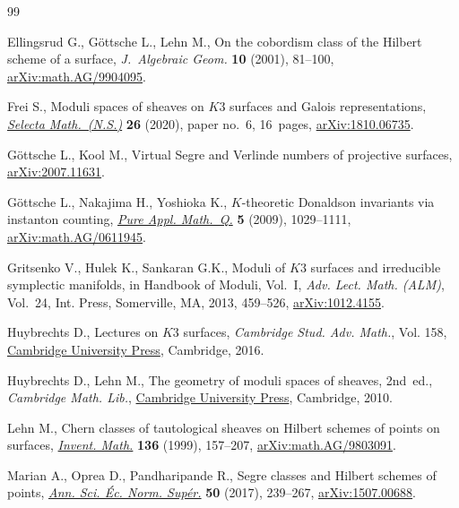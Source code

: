 \documentclass[pdftex]{sigma}
\numberwithin{equation}{section}
\newcommand{\1}{\mathsf{1}}
\begin{document}
%
%

\begin{thebibliography}{99}
\footnotesize\itemsep=0pt

Ellingsrud G., G\"ottsche L., Lehn M., On the cobordism class of the {H}ilbert
  scheme of a surface, \textit{J.~Algebraic Geom.} \textbf{10} (2001), 81--100,
  \href{https://arxiv.org/abs/math.AG/9904095}{arXiv:math.AG/9904095}.

Frei S., Moduli spaces of sheaves on {$K3$} surfaces and {G}alois
  representations, \href{https://doi.org/10.1007/s00029-019-0530-7}{\textit{Selecta Math.~(N.S.)}} \textbf{26} (2020), paper no.~6, 16~pages, \href{https://arxiv.org/abs/1810.06735}{arXiv:1810.06735}.

G\"ottsche L., Kool M., Virtual Segre and Verlinde numbers of projective
  surfaces, \href{https://arxiv.org/abs/2007.11631}{arXiv:2007.11631}.

G\"ottsche L., Nakajima H., Yoshioka K., {$K$}-theoretic {D}onaldson invariants
  via instanton counting, \href{https://doi.org/10.4310/PAMQ.2009.v5.n3.a5}{\textit{Pure Appl. Math.~Q.}} \textbf{5} (2009),
  1029--1111, \href{https://arxiv.org/abs/math.AG/0611945}{arXiv:math.AG/0611945}.

Gritsenko V., Hulek K., Sankaran G.K., Moduli of {$K3$} surfaces and irreducible
  symplectic manifolds, in Handbook of Moduli, {V}ol.~{I}, \textit{Adv. Lect.
  Math. (ALM)}, Vol.~24, Int. Press, Somerville, MA, 2013, 459--526,
  \href{https://arxiv.org/abs/1012.4155}{arXiv:1012.4155}.

Huybrechts D., Lectures on {$K3$} surfaces, \textit{Cambridge Stud. Adv. Math.},
  Vol. 158, \href{https://doi.org/10.1017/CBO9781316594193}{Cambridge University Press}, Cambridge, 2016.

Huybrechts D., Lehn M., The geometry of moduli spaces of sheaves, 2nd~ed.,
  \textit{Cambridge Math. Lib.}, \href{https://doi.org/10.1017/CBO9780511711985}{Cambridge University Press}, Cambridge, 2010.

Lehn M., Chern classes of tautological sheaves on {H}ilbert schemes of points
  on surfaces, \href{https://doi.org/10.1007/s002220050307}{\textit{Invent. Math.}} \textbf{136} (1999), 157--207,
  \href{https://arxiv.org/abs/math.AG/9803091}{arXiv:math.AG/9803091}.

Marian A., Oprea D., Pandharipande R., Segre classes and {H}ilbert schemes of
  points, \href{https://doi.org/10.24033/asens.2320}{\textit{Ann. Sci. \'Ec. Norm. Sup\'er.}} \textbf{50} (2017), 239--267,
  \href{https://arxiv.org/abs/1507.00688}{arXiv:1507.00688}.


\end{thebibliography}
\end{document}
